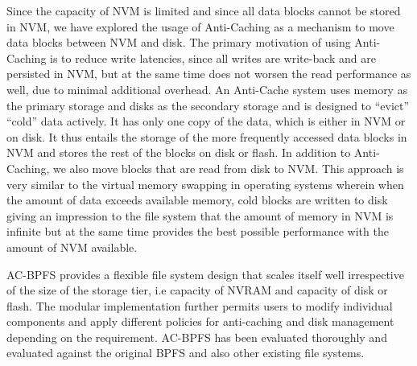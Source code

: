 Since the capacity of NVM is limited and since all data blocks cannot be stored in NVM, we have explored the usage of Anti-Caching \cite{c13} as a mechanism to move data blocks between NVM and disk. The primary motivation of using Anti-Caching is to reduce write latencies, since all writes are write-back and are persisted in NVM, but at the same time does not worsen the read performance as well, due to minimal additional overhead. An Anti-Cache system uses memory as the primary storage and disks as the secondary storage and is designed to “evict” “cold” data actively. It has only one copy of the data, which is either in NVM or on disk. It thus entails the storage of the more frequently accessed data blocks in NVM and stores the rest of the blocks on disk or flash. In addition to Anti-Caching, we also move blocks that are read from disk to NVM. This approach is very similar to the virtual memory swapping in operating systems wherein when the amount of data exceeds available memory, cold blocks are written to disk giving an impression to the file system that the amount of memory in NVM is infinite but at the same time provides the best possible performance with the amount of NVM available.

AC-BPFS provides a flexible file system design that scales itself well irrespective of the size of the storage tier, i.e capacity of NVRAM and capacity of disk or flash. The modular implementation further permits users to modify individual components and apply different policies for anti-caching and disk management depending on the requirement. AC-BPFS has been evaluated thoroughly and evaluated against the original BPFS and also other existing file systems. 

 
